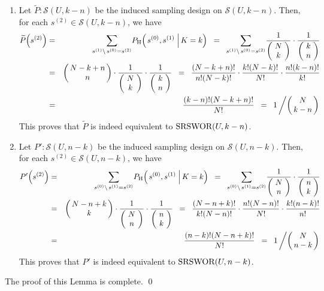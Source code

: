 \begin{enumerate}
\item
Let $\widetilde{P} : \mathcal{S}(U,k-n)$ be the induced sampling design on $\mathcal{S}(U,k-n)$.
Then, for each $s^{(2)} \in \mathcal{S}(U,k-n)$, we have
\begin{eqnarray*}
\widetilde{P}\!\left(s^{(2)}\right)
& = & \underset{s^{(1)}\backslash\,s^{(0)}=s^{(2)}}{\sum} P_{\textnormal{H}}\!\left(\left. s^{(0)},s^{(1)}\;\right\vert K = k \right)
\;\; = \;\; \underset{s^{(1)}\backslash\,s^{(0)}=s^{(2)}}{\sum} \dfrac{1}{\NCk}\cdot\dfrac{1}{\kCn}
\\
& = & \left(\!\!\begin{array}{c} N - k + n \\ n \end{array}\!\!\right)\cdot\dfrac{1}{\NCk}\cdot\dfrac{1}{\kCn}
\;\;=\;\; \dfrac{(N-k+n)!}{n!(N-k)!} \cdot \dfrac{k!(N-k)!}{N!} \cdot \dfrac{n!(k-n)!}{k!}
\\
& = & \dfrac{(k-n)!(N-k+n)!}{N!} \;\; = \;\; 1 \left/ \left(\!\!\begin{array}{c} N \\ k - n \end{array}\!\!\right) \right.
\end{eqnarray*}
This proves that $\widetilde{P}$ is indeed equivalent to $\textnormal{SRSWOR}(U,k-n)$.

\item
Let $P' : \mathcal{S}(U,n-k)$ be the induced sampling design on $\mathcal{S}(U,n-k)$.
Then, for each $s^{(2)} \in \mathcal{S}(U,n-k)$, we have
\begin{eqnarray*}
P'\!\left(s^{(2)}\right)
& = & \underset{s^{(0)}\backslash\,s^{(1)}=s^{(2)}}{\sum} P_{\textnormal{H}}\!\left(\left. s^{(0)},s^{(1)}\;\right\vert K = k \right)
\;\; = \;\; \underset{s^{(0)}\backslash\,s^{(1)}=s^{(2)}}{\sum} \dfrac{1}{\NCn}\cdot\dfrac{1}{\nCk}
\\
& = & \left(\!\!\begin{array}{c} N - n + k \\ k \end{array}\!\!\right)\cdot\dfrac{1}{\NCn}\cdot\dfrac{1}{\nCk}
\;\;=\;\; \dfrac{(N-n+k)!}{k!(N-n)!} \cdot \dfrac{n!(N-n)!}{N!} \cdot \dfrac{k!(n-k)!}{n!}
\\
& = & \dfrac{(n-k)!(N-n+k)!}{N!} \;\; = \;\; 1 \left/ \left(\!\!\begin{array}{c} N \\ n - k \end{array}\!\!\right) \right.
\end{eqnarray*}
This proves that $P'$ is indeed equivalent to $\textnormal{SRSWOR}(U,n-k)$.
\end{enumerate}
The proof of this Lemma is complete.
\qed

